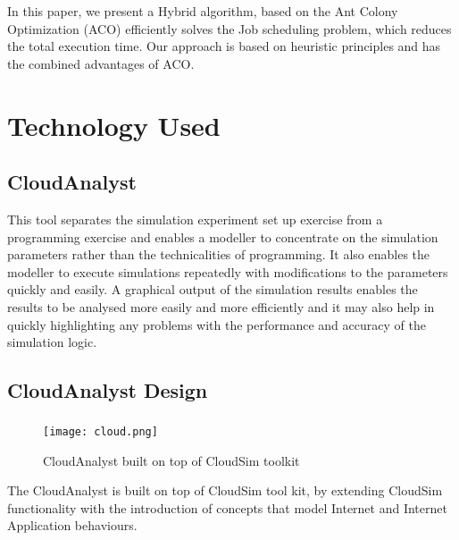 \documentclass[a4paper,12pt]{report}
\begin{document}
{{{{{{			\par In   this   paper,   we   present   a   Hybrid   algorithm,   based   on   the   Ant   Colony   Optimization (ACO)  efficiently solves the Job scheduling problem,  which  reduces  the  total  execution  time.  Our  approach  is  based  on  heuristic  principles  and  has  the  combined  advantages  of  ACO. 
			
			 \chapter{Technology Used}
			 \paragraph{}
			 {
			 	\linespread{1.5}
			 				 	\section{ CloudAnalyst}
			 				 	This tool separates the simulation experiment set up exercise from a programming exercise and enables a modeller to concentrate on the simulation parameters rather than the technicalities of programming. It also enables the modeller to execute simulations repeatedly with modifications to the parameters quickly and easily. A graphical output of the simulation results enables the results to be analysed more easily and more efficiently and it may also help in quickly highlighting any problems with the performance and accuracy of the simulation logic.
			 			\pagebreak	 	
			 	
			 	\section{ CloudAnalyst Design}
			 	\paragraph{}
			 	{
			 			\begin{figure}[h]
			 			\begin{center}
			 				\texttt{[image: cloud.png]}\\
			 			\end{center}
		 					 		\caption{CloudAnalyst built on top of CloudSim toolkit}
			 		\end{figure}

		 		\par The CloudAnalyst is built on top of CloudSim tool kit, by extending CloudSim functionality with the introduction of concepts that model Internet and Internet Application behaviours.  
			
}}}}}}}}
\end{document}

